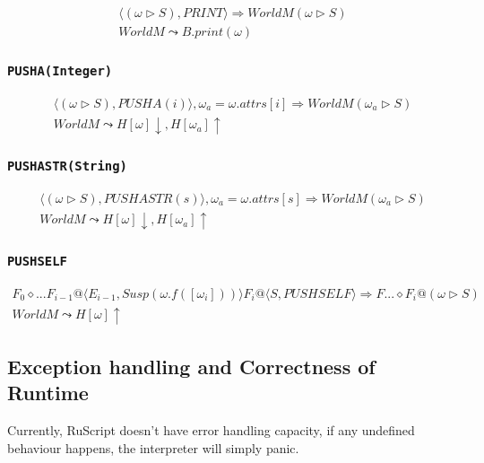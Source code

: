 \documentclass[]{article}
\numberwithin{equation}{section}
\numberwithin{figure}{section}
\numberwithin{table}{section}
\begin{document}
\begin{gather*}
  \langle (\omega \rhd S), PRINT\rangle \Rightarrow WorldM (\omega \rhd S) \\
  WorldM \leadsto B.print(\omega)
\end{gather*}

\subsubsection{\texttt{PUSHA(Integer)}}

\begin{gather*}
  \langle (\omega \rhd S), PUSHA(i) \rangle, \omega_a = \omega.attrs[i] \Rightarrow WorldM (\omega_a \rhd S) \\
  WorldM \leadsto H[\omega] \downarrow, H[\omega_a] \uparrow
\end{gather*}

\subsubsection{\texttt{PUSHASTR(String)}}

\begin{gather*}
  \langle (\omega \rhd S), PUSHASTR(s) \rangle, \omega_a = \omega.attrs[s] \Rightarrow WorldM (\omega_a \rhd S) \\
  WorldM \leadsto H[\omega] \downarrow, H[\omega_a] \uparrow
\end{gather*}

\subsubsection{\texttt{PUSHSELF}}

\begin{gather*}
  F_0 \diamond ... F_{i-1}@\langle E_{i-1}, Susp(\omega.f([\omega_i])) \rangle F_i@ \langle S, PUSHSELF \rangle \Rightarrow F... \diamond F_i@ ( \omega   \rhd S) \\
  WorldM \leadsto H[\omega] \uparrow
\end{gather*}

\subsection{Exception handling and Correctness of Runtime}\label{exception-handling-and-correctness-protocol}

Currently, RuScript doesn't have error handling capacity, if any
undefined behaviour happens, the interpreter will simply panic.
\end{document}
